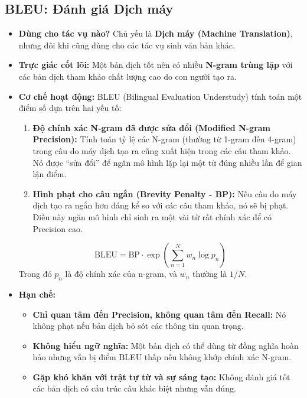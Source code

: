\subsection{BLEU: Đánh giá Dịch máy}
\label{ssec:bleu}
\begin{itemize}
    \item \textbf{Dùng cho tác vụ nào?} Chủ yếu là \textbf{Dịch máy (Machine Translation)}, nhưng đôi khi cũng dùng cho các tác vụ sinh văn bản khác.
    \item \textbf{Trực giác cốt lõi:} Một bản dịch tốt nên có nhiều \textbf{N-gram trùng lặp} với các bản dịch tham khảo chất lượng cao do con người tạo ra.
    \item \textbf{Cơ chế hoạt động:} BLEU (Bilingual Evaluation Understudy) tính toán một điểm số dựa trên hai yếu tố:
        \begin{enumerate}
            \item \textbf{Độ chính xác N-gram đã được sửa đổi (Modified N-gram Precision):} Tính toán tỷ lệ các N-gram (thường từ 1-gram đến 4-gram) trong câu do máy dịch tạo ra cũng xuất hiện trong các câu tham khảo. Nó được “sửa đổi” để ngăn mô hình lặp lại một từ đúng nhiều lần để gian lận điểm.
            \item \textbf{Hình phạt cho câu ngắn (Brevity Penalty - BP):} Nếu câu do máy dịch tạo ra ngắn hơn đáng kể so với các câu tham khảo, nó sẽ bị phạt. Điều này ngăn mô hình chỉ sinh ra một vài từ rất chính xác để có Precision cao.
        \end{enumerate}
        $$ \text{BLEU} = \text{BP} \cdot \exp\left(\sum_{n=1}^{N} w_n \log p_n\right) $$
        Trong đó $p_n$ là độ chính xác của n-gram, và $w_n$ thường là $1/N$.
    \item \textbf{Hạn chế:}
        \begin{itemize}
            \item \textbf{Chỉ quan tâm đến Precision, không quan tâm đến Recall:} Nó không phạt nếu bản dịch bỏ sót các thông tin quan trọng.
            \item \textbf{Không hiểu ngữ nghĩa:} Một bản dịch có thể dùng từ đồng nghĩa hoàn hảo nhưng vẫn bị điểm BLEU thấp nếu không khớp chính xác N-gram.
            \item \textbf{Gặp khó khăn với trật tự từ và sự sáng tạo:} Không đánh giá tốt các bản dịch có cấu trúc câu khác biệt nhưng vẫn đúng.
        \end{itemize}
\end{itemize}

